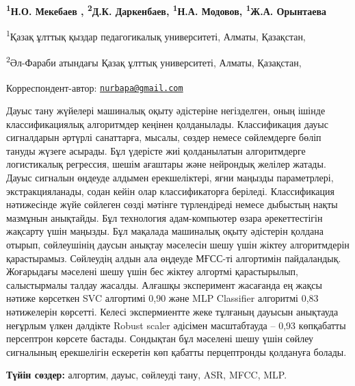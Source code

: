 
\begin{articleheader}

{\bfseries
\textsuperscript{1}Н.О. Мекебаев\textsuperscript{\envelope } \authorid,
\textsuperscript{2}Д.К. Даркенбаев\authorid,
\textsuperscript{1}Н.А. Модовов\authorid,
\textsuperscript{1}Ж.А. Орынтаева\authorid}
\end{articleheader}

\begin{affiliation}
\textsuperscript{1}Қазақ ұлттық қыздар педагогикалық университеті, Алматы, Қазақстан,

\textsuperscript{2}Әл-Фараби атындағы Қазақ ұлттық университеті, Алматы, Қазақстан,

\raggedright \textsuperscript{\envelope }Корреспондент-автор: \href{mailto:nurbapa@gmail.com}{\nolinkurl{nurbapa@gmail.com}}
\end{affiliation}

Дауыс тану жүйелері машиналық оқыту әдістеріне негізделген, оның ішінде
классификациялық алгоритмдер кеңінен қолданылады. Классификация дауыс
сигналдарын әртүрлі санаттарға, мысалы, сөздер немесе сөйлемдерге бөліп
тануды жүзеге асырады. Бұл үдерісте жиі қолданылатын алгоритмдерге
логистикалық регрессия, шешім ағаштары және нейрондық желілер жатады.
Дауыс сигналын өңдеуде алдымен ерекшеліктері, яғни маңызды параметрлері,
экстракцияланады, содан кейін олар классификаторға беріледі.
Классификация нәтижесінде жүйе сөйлеген сөзді мәтінге түрлендіреді
немесе дыбыстың нақты мазмұнын анықтайды. Бұл технология адам-компьютер
өзара әрекеттестігін жақсарту үшін маңызды. Бұл мақалада машиналық оқыту
әдістерін қолдана отырып, сөйлеушінің даусын анықтау мәселесін шешу үшін
жіктеу алгоритмдерін қарастырамыз. Сөйлеудің алдын ала өңдеуде МҒСС-ті
алгортимін пайдаландық. Жоғарыдағы мәселені шешу үшін бес жіктеу
алгортмі қарастырылып, салыстырмалы талдау жасалды. Алғашқы эксперимент
жасағанда ең жақсы нәтиже көрсеткен SVC алгортимі 0,90 және MLP
Classifier алгоритмі 0,83 нәтижелерін көрсетті. Келесі экспермиентте
жеке тұлғаның дауысын анықтауда неғұрлым үлкен дәлдікте Robust scaler
әдісімен масштабтауда -- 0,93 көпқабатты персептрон көрсете бастады.
Сондықтан бұл мәселені шешу үшін сөйлеу сигналының ерекшелігін ескеретін
көп қабатты перцептронды қолдануға болады.

{\bfseries Түйін сөздер:} алгортим, дауыс, сөйлеуді тану, ASR, MFCC, MLP.


